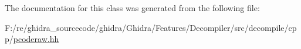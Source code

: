 The documentation for this class was generated from the following file\+:\begin{DoxyCompactItemize}
\item 
F\+:/re/ghidra\+\_\+sourcecode/ghidra/\+Ghidra/\+Features/\+Decompiler/src/decompile/cpp/\mbox{\hyperlink{pcoderaw_8hh}{pcoderaw.\+hh}}\end{DoxyCompactItemize}
